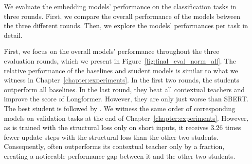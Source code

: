 We evaluate the embedding models' performance on the classification tasks in
three rounds. First, we compare the overall performance of the models between
the three different rounds. Then, we explore the models' performances per task
in detail.


First, we focus on the overall models' performance throughout the three
evaluation rounds, which we present in Figure~\ref{fig:final_eval_norm_all}. The
relative performance of the baselines and student models is similar to what we witness in
Chapter~\ref{chapter:experiments}. In the first two rounds, the students
outperform all baselines. In the last round, they beat all contextual teachers
and improve the score of Longformer. However, they are only just worse than
SBERT. The best student is {\OnlyMSEStudent} followed by
{\MSEStudent}. We witness the same order of corresponding models on validation tasks at the end of Chapter~\ref{chapter:experiments}. However, as {\CosineStudent} is trained with
the structural loss only on short inputs, it receives 3.26 times fewer update
steps with the structural loss than the other two students. Consequently,
{\CosineStudent} often outperforms its contextual teacher only by a fraction,
creating a noticeable performance gap between it and the
other two students.

